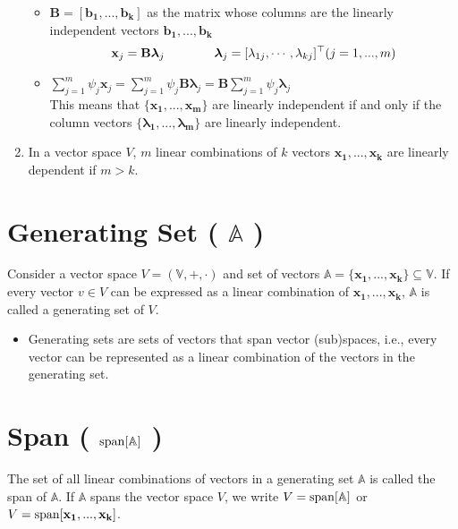 \begin{enumerate}
\begin{itemize}
        \item $\mathbf{B} = [\mathbf{b_1, ..., b_k}]$ as the matrix whose columns are the linearly independent vectors $\mathbf{b_1, ..., b_k}$
        \[
            \mathbf{x}_j = \mathbf{B{\bm{\lambda}}}_j \quad\quad\quad\quad \bm{\lambda}_j = [\lambda_{1j}, \cdots, \lambda_{kj}]^\top
            \hfill (j=1, ...,m)
        \]

        \item \( \displaystyle \sum_{j=1}^{m} \psi_j \mathbf{x}_j = \sum_{j=1}^{m} \psi_j \mathbf{B}\bm{\lambda}_j = \mathbf{B}\sum_{j=1}^{m} \psi_j \bm{\lambda}_j \)\\
        This means that $\{\mathbf{x_1, ..., x_m}\}$ are linearly independent if and only if the column vectors $\{\bm{\lambda_1, ..., \lambda_m}\}$ are linearly independent.

    \end{itemize}

    \item In a vector space $V$, $m$ linear combinations of $k$ vectors $\mathbf{x_1, ..., x_k}$ are linearly dependent if $m > k$.
\end{enumerate}


\section{Generating Set ( $\mathbb{A}$ ) \cite{mfml-1}}\label{Generating Set}
Consider a vector space $V = (\mathbb{V}, +, \cdot)$ and set of vectors $\mathbb{A} = \mathbf{\{x_1, . . . , x_k\}} \subseteq \mathbb{V}$. If every vector $v \in V$ can be expressed as a linear combination of $\mathbf{x_1, . . . , x_k}$, $\mathbb{A}$ is called a generating set of $V$.

\begin{itemize}
    \item Generating sets are sets of vectors that span vector (sub)spaces, i.e., every vector can be represented as a linear combination of the vectors in the generating set.
\end{itemize}


\section{Span ( $\operatorname{span}[\mathbb{A}]$ ) \cite{mfml-1}} \label{lin-alg: Span}
The set of all linear combinations of vectors in a generating set $\mathbb{A}$ is called the span of $\mathbb{A}$. If $\mathbb{A}$ spans the vector space $V$, we write $V = \operatorname{span}[\mathbb{A}]$ or $V = \operatorname{span}[\mathbf{x_1, . . . , x_k}]$.




